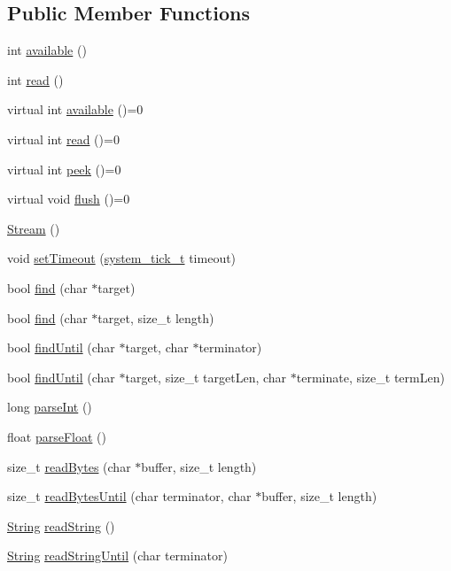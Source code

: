 \subsection*{Public Member Functions}
\begin{DoxyCompactItemize}
\item 
int \hyperlink{class_stream_a747aa1d8db334a7b735a48dbc135478c}{available} ()
\item 
int \hyperlink{class_stream_a654017caec3e3feeba5feb346d83c7bb}{read} ()
\item 
virtual int \hyperlink{class_stream_a9c98a763395005c08ce95afb2f06c7b1}{available} ()=0
\item 
virtual int \hyperlink{class_stream_aea5dee9fcb038148515b7c9212d38dc0}{read} ()=0
\item 
virtual int \hyperlink{class_stream_a30c3c212ec6ea67277a708c5ea2501a5}{peek} ()=0
\item 
virtual void \hyperlink{class_stream_aa3ef2c34f152a0b2ea8de9139b9461da}{flush} ()=0
\item 
\hyperlink{class_stream_a8c3f05bd00361ec92627fa41f330a39b}{Stream} ()
\item 
void \hyperlink{class_stream_abaa50647d6dbb3baf7697a2691a06177}{set\+Timeout} (\hyperlink{system__tick__hal_8h_a272b267acff35fc07ab6b6011843dd6c}{system\+\_\+tick\+\_\+t} timeout)
\item 
bool \hyperlink{class_stream_a4bab30ccd324efd461dee46a2339f673}{find} (char $\ast$target)
\item 
bool \hyperlink{class_stream_ad851401f2318cdb1de05707e021b81d9}{find} (char $\ast$target, size\+\_\+t length)
\item 
bool \hyperlink{class_stream_ad1f5f6600832396fb38a897baf4de35b}{find\+Until} (char $\ast$target, char $\ast$terminator)
\item 
bool \hyperlink{class_stream_a3a9497de614792103ab8cb4759e01a69}{find\+Until} (char $\ast$target, size\+\_\+t target\+Len, char $\ast$terminate, size\+\_\+t term\+Len)
\item 
long \hyperlink{class_stream_a497ffcbcb4d5bb889a8fde487bcc1b98}{parse\+Int} ()
\item 
float \hyperlink{class_stream_a5e5a0cc11eb586d89dcb7fa8e53a87e8}{parse\+Float} ()
\item 
size\+\_\+t \hyperlink{class_stream_a45fd1336a323ea83b16e8507055f44ea}{read\+Bytes} (char $\ast$buffer, size\+\_\+t length)
\item 
size\+\_\+t \hyperlink{class_stream_af84672a4fb2620466958d3118d4fea00}{read\+Bytes\+Until} (char terminator, char $\ast$buffer, size\+\_\+t length)
\item 
\hyperlink{class_string}{String} \hyperlink{class_stream_a1c60bdda2b65d78e5a1362d51b856c5a}{read\+String} ()
\item 
\hyperlink{class_string}{String} \hyperlink{class_stream_a6a409da87c552909260d8cc428c5ca70}{read\+String\+Until} (char terminator)
\end{DoxyCompactItemize}
